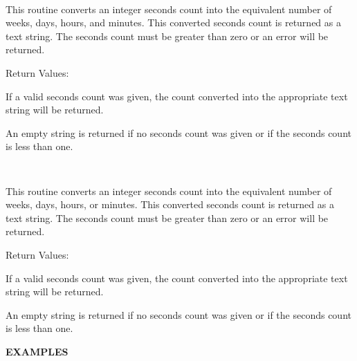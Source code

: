 \begin{description}

\item {}\verb" "

This routine converts an integer seconds count into the equivalent number of
weeks, days, hours, and minutes.  This converted seconds count is returned
as a text string.  The seconds count must be greater than zero or an error
will be returned.

Return Values:

\begin{description}
\item If a valid seconds count was given, the count converted into the
appropriate text string will be returned.

\item An empty string is returned if no seconds count was given or if
the seconds count is less than one.
\end{description}

\item {}\verb" "

This routine converts an integer seconds count into the equivalent number of
weeks, days, hours, or minutes.  This converted seconds count is returned
as a text string.  The seconds count must be greater than zero or an error
will be returned.

Return Values:

\begin{description}
\item If a valid seconds count was given, the count converted into the
appropriate text string will be returned.

\item An empty string is returned if no seconds count was given or if
the seconds count is less than one.
\end{description}

\end{description}

{\bf EXAMPLES}

